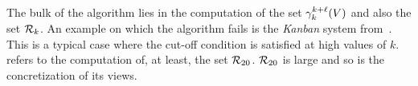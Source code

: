 The bulk of the algorithm lies in the computation of the set $\gamma_{k}^{k+\ell} (V) $ and also the set $\mathcal{R}_{k}$.
%
An example on which the algorithm fails is the {\it Kanban} system from~\cite{cutoff}.
%
This is a typical case where the cut-off condition is satisfied at high values of $k$.
%
\cite{cutoff} refers to the computation of, at least, the set
$\mathcal{R}_{20}$. $\mathcal{R}_{20}$ is large and so is the concretization
of its views.
